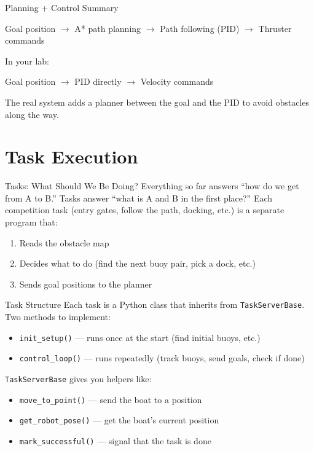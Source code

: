 \documentclass[aspectratio=169]{beamer}
\begin{document}
\begin{frame}{Planning + Control Summary}
    \begin{center}
        Goal position $\rightarrow$ A* path planning $\rightarrow$ Path following (PID) $\rightarrow$ Thruster commands
    \end{center}
    \vfill
    In your lab:
    \begin{center}
        Goal position $\rightarrow$ PID directly $\rightarrow$ Velocity commands
    \end{center}
    \vfill
    The real system adds a planner between the goal and the PID to avoid obstacles along the way.
\end{frame}

\section{Task Execution}

\begin{frame}{Tasks: What Should We Be Doing?}
    Everything so far answers ``how do we get from A to B.''
    \vfill
    Tasks answer ``what is A and B in the first place?''
    \vfill
    Each competition task (entry gates, follow the path, docking, etc.) is a separate program that:
    \begin{enumerate}
        \item Reads the obstacle map
        \item Decides what to do (find the next buoy pair, pick a dock, etc.)
        \item Sends goal positions to the planner
    \end{enumerate}
\end{frame}

\begin{frame}{Task Structure}
    Each task is a Python class that inherits from \texttt{TaskServerBase}.
    \vfill
    Two methods to implement:
    \begin{itemize}
        \item \texttt{init\_setup()} --- runs once at the start (find initial buoys, etc.)
        \item \texttt{control\_loop()} --- runs repeatedly (track buoys, send goals, check if done)
    \end{itemize}
    \vfill
    \texttt{TaskServerBase} gives you helpers like:
    \begin{itemize}
        \item \texttt{move\_to\_point()} --- send the boat to a position
        \item \texttt{get\_robot\_pose()} --- get the boat's current position
        \item \texttt{mark\_successful()} --- signal that the task is done
    \end{itemize}
\end{frame}
\end{document}
